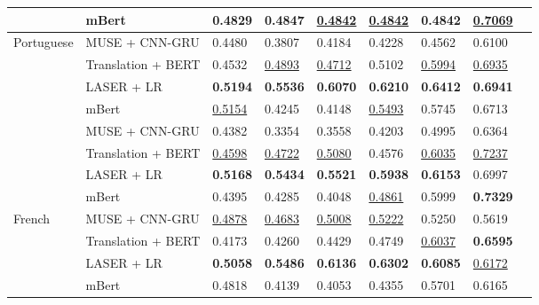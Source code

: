 \documentclass[runningheads]{llncs}
\begin{document}
\begin{table}[!tb]
{\begin{tabular}{lllllllll}
                            & mBert                  &0.4829    &0.4847    &\underline{0.4842}    &\underline{0.4842}     &0.4842     &\underline{0.7069}               \\ \midrule
\multirow{5}{*}{Portuguese}  & MUSE + CNN-GRU        &0.4480    &0.3807    &0.4184    &0.4228     &0.4562     &0.6100               \\
                            & Translation + BERT    &0.4532    &\underline{0.4893}    &\underline{0.4712}    &0.5102     &\underline{0.5994}     &\underline{0.6935}               \\
                            & LASER + LR             &\textbf{0.5194} &\textbf{0.5536}  &\textbf{0.6070}  &\textbf{0.6210}  &\textbf{0.6412}     &\textbf{0.6941}\\
                            & mBert                  &\underline{0.5154}  & 0.4245 & 0.4148 & \underline{0.5493}  & 0.5745  & 0.6713            \\ \midrule
\multirow{5}{*}{Spanish}    & MUSE + CNN-GRU        &0.4382    &0.3354    &0.3558    &0.4203     &0.4995     &0.6364               \\
                            & Translation + BERT    &\underline{0.4598}    &\underline{0.4722}    &\underline{0.5080}    &0.4576     &\underline{0.6035}     &\underline{0.7237}               \\
                            & LASER + LR             &\textbf{0.5168}    &\textbf{0.5434}    &\textbf{0.5521}    &\textbf{0.5938}     &\textbf{0.6153}  &0.6997\\
                            & mBert                  &0.4395  &0.4285  & 0.4048 & \underline{0.4861}  &   0.5999  & \textbf{0.7329}               \\ \midrule
\multirow{5}{*}{French}     & MUSE + CNN-GRU        &\underline{0.4878}    &\underline{0.4683}    &\underline{0.5008}    &\underline{0.5222}     &0.5250     &0.5619               \\
                            & Translation + BERT    &0.4173    &0.4260    &0.4429    &0.4749     &\underline{0.6037}     &\textbf{0.6595}               \\
                            & LASER + LR             &\textbf{0.5058}    &\textbf{0.5486}    &\textbf{0.6136}    &\textbf{0.6302}     &\textbf{0.6085}     &\underline{0.6172}\\
                            & mBert                  & 0.4818 & 0.4139 & 0.4053 & 0.4355  & 0.5701  & 0.6165             \\
                            \bottomrule
\end{tabular}}

\end{table}
\end{document}
